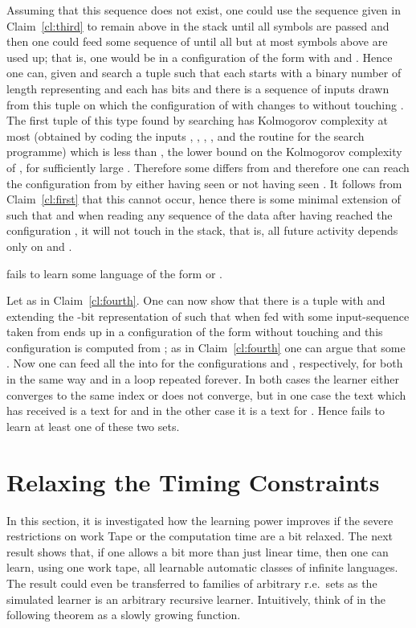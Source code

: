 \documentclass{LMCS}
\theoremstyle{plain}\newtheorem{athm}[thm]{Theorem}
\theoremstyle{plain}\newtheorem{aprop}[thm]{Proposition}
\theoremstyle{plain}\newtheorem{aprob}[thm]{Open Problem}
\theoremstyle{plain}\newtheorem{acor}[thm]{Corollary}
\theoremstyle{plain}\newtheorem{alem}[thm]{Lemma}
\theoremstyle{definition}\newtheorem{adefn}[thm]{Definition}
\theoremstyle{definition}\newtheorem{arem}[thm]{Remark}
\theoremstyle{plain}\newtheorem{aexmp}[thm]{Example}
\theoremstyle{plain}\newtheorem{aclm}[thm]{Claim}
\def\niceqed{~~}
\begin{document}
\noindent
Assuming that this sequence does not exist, one could use the sequence
given in Claim~\ref{cl:third} to remain above  in the stack until all
symbols are passed and then one could feed some sequence of  until
all but at most  symbols above  are used up; that is, one would
be in a configuration of the form  with  and
. Hence one can, given  and
 search a
tuple  such that each  starts with a binary
number of length  representing  and each  has  bits
and there is a sequence of inputs drawn from this tuple on which the
configuration of  with  changes to
 without
touching . The first tuple  of this type
found by searching has Kolmogorov complexity at most
 (obtained by coding the inputs , , ,
,  and
the routine for the search programme) which is less than 
, the lower bound on the 
Kolmogorov complexity of , for sufficiently large .
Therefore some  differs from  and therefore one can reach
the configuration  from  by
either having seen
 or not having seen . It follows from Claim~\ref{cl:first}
that this cannot occur, hence there is some minimal extension 
of  such that  and when reading any sequence of the
data  after having reached the
configuration , it will not touch  in the stack,
that is, all future activity depends only on  and .

\begin{clm} \label{cl:fifth}
 fails to learn some language of the form
 or .
\end{clm}

\noindent
Let  as in
Claim~\ref{cl:fourth}. One can now
show that there is a tuple  with
 and  extending the -bit representation of 
such that  when fed with some input-sequence taken from
 ends up in a
configuration of the form  without touching  and
this configuration is computed from ; as in
Claim~\ref{cl:fourth} one can argue that some .
Now one can feed all the  into  for the
configurations  and , respectively,
for both in the same way and in a loop repeated forever.
In both cases the learner 
either converges to the same index or does not converge,
but in one case the text which  has received is a text for 
and in the other case it is a text for .
Hence  fails to learn at least one of these two sets.\niceqed

\section{Relaxing the Timing Constraints}

\noindent
In this section, it is investigated how the learning power improves
if the severe restrictions on work Tape  or the computation
time are a bit relaxed.
The next result shows that, if one allows a bit more than just linear time,
then one can learn, using one work tape, all learnable
automatic classes of infinite languages. 
The result could even be transferred to families of arbitrary
r.e.\ sets as the simulated learner is an arbitrary recursive learner.
Intuitively, think of  in the following theorem as a slowly growing
function.
\end{document}
